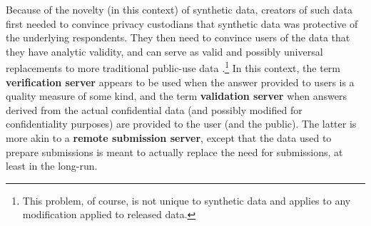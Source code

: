 \documentclass[inline]{hdsr}
\begin{document}
Because of the novelty (in this context) of synthetic data, creators of such data first needed to convince privacy custodians that synthetic data was protective of the underlying respondents. They then need to convince users of the data that they have analytic validity, and can serve as valid and possibly universal replacements to more traditional public-use data \citep{reiter_verification_2009}.\footnote{This problem, of course, is not unique to synthetic data and applies to any modification applied to released data.} In this context, the term \textbf{verification server} appears to be used  when the answer provided to users is a quality measure of some kind, and the term \textbf{validation server} when answers derived from the actual confidential data (and possibly modified for confidentiality purposes) are provided to the user (and the public). The latter is more akin to a \textbf{remote submission server}, except that the data used to prepare submissions is meant to actually replace the need for submissions, at least in the long-run.  
\end{document}
